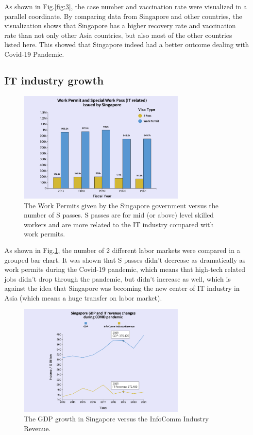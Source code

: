 \documentclass[conference]{IEEEtran}
\begin{document}
As shown in Fig.\ref{fig:3}, the case number and vaccination rate were visualized in a parallel coordinate. By comparing data from Singapore and other countries, the visualization shows that Singapore has a higher recovery rate and vaccination rate than not only other Asia countries, but also most of the other countries listed here. This showed that Singapore indeed had a better outcome dealing with Covid-19 Pandemic.

\subsection{IT industry growth}

\begin{figure}[H]
\centering
\includegraphics[width=3.3in]{4}
\caption{The Work Permits given by the Singapore government versus the number of S passes. S passes are for mid (or above) level skilled workers and are more related to the IT industry compared with work permits.}
\label{fig:4}
\end{figure}

As shown in Fig.\ref{fig:4}, the number of 2 different labor markets were compared in a grouped bar chart. It was shown that S passes didn’t decrease as dramatically as work permits during the Covid-19 pandemic, which means that high-tech related jobs didn’t drop through the pandemic, but didn’t increase as well, which is against the idea that Singapore was becoming the new center of IT industry in Asia (which means a huge transfer on labor market).

\begin{figure}[H]
\centering
\includegraphics[width=3.3in]{5}
\caption{The GDP growth in Singapore versus the InfoComm Industry Revenue.}
\label{fig:5}
\end{figure}
\end{document}
